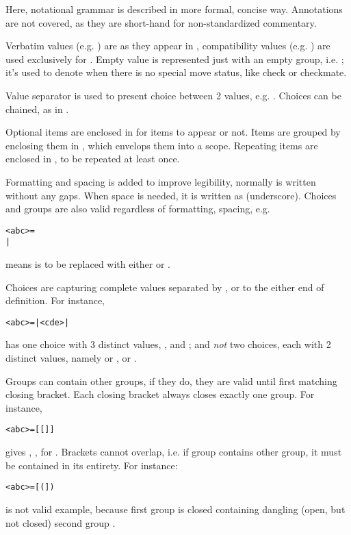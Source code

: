 Here, notational grammar is described in more formal, concise way. Annotations
are not covered, as they are short-hand for non-standardized commentary.

Verbatim values (e.g. ) are as they appear in , compatibility
values (e.g. ) are used exclusively for . Empty value is
represented just with an empty group, i.e. \algfmt{()}; it's used to denote when
there is no special move status, like check or checkmate.

Value separator \algfmt{|} is used to present choice between 2 values, e.g.
 \algfmt{|} . Choices can be chained, as in
 \algfmt{|}  \algfmt{|} .

Optional items are enclosed in \algfmt{[ ]} for items to appear or not. Items are
grouped by enclosing them in \algfmt{( )}, which envelops them into a scope.
Repeating items are enclosed in \algfmt{\{ \}}, to be repeated at least once.

\clearpage %

Formatting and spacing is added to improve legibility, normally  is
written without any gaps. When space is needed, it is written as \alg{\_}
(underscore). Choices and groups are also valid regardless of formatting,
spacing, e.g.
\begin{alltt}
<abc> = 
  | 
\end{alltt}
means  is to be replaced with either  or .

Choices are capturing complete values separated by \algfmt{|}, or to the either
end of definition. For instance,
\begin{alltt}
<abc> =  |  <cde>  | 
\end{alltt}
has one choice with 3 distinct values, ,  and
; and \emph{not} two choices, each with 2 distinct values, namely  or
,  or .

Groups can contain other groups, if they do, they are valid until first matching
closing bracket. Each closing bracket always closes exactly one group. For instance,
\begin{alltt}
<abc> =  [  [  ]  ] 
\end{alltt}
gives , ,  for .
Brackets cannot overlap, i.e. if group contains other group, it must be contained in
its entirety. For instance:
\begin{alltt}
<abc> =  [  (  ]  ) 
\end{alltt}
is not valid example, because first group \algfmt{[ ]} is closed containing
dangling (open, but not closed) second group \algfmt{( )}.


